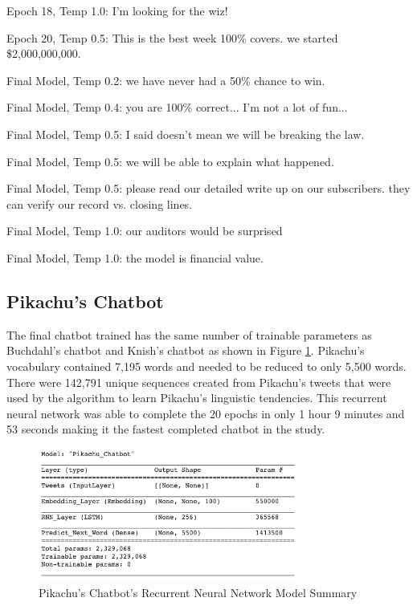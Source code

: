 \documentclass[5p,authoryear]{elsarticle}
\begin{document}
Epoch 18, Temp 1.0:
I’m looking for the wiz! 

Epoch 20, Temp 0.5:
This is the best week 100\% covers. we started \$2,000,000,000.

Final Model, Temp 0.2:
we have never had a 50\% chance to win. 

Final Model, Temp 0.4:
you are 100\% correct... I’m not a lot of fun... 

Final Model, Temp 0.5:
I said doesn’t mean we will be breaking the law.

Final Model, Temp 0.5:
we will be able to explain what happened. 

Final Model, Temp 0.5:
please read our detailed write up on our subscribers. they can verify our record vs. closing lines. 


Final Model, Temp 1.0:
our auditors would be surprised

Final Model, Temp 1.0:
the model is financial value. 



\subsection{Pikachu’s Chatbot}


The final chatbot trained has the same number of trainable parameters as Buchdahl’s chatbot and Knish’s chatbot as shown in Figure \ref{Pika Summary}. Pikachu’s vocabulary contained 7,195 words and needed to be reduced to only 5,500 words. There were 142,791 unique sequences created from Pikachu’s tweets that were used by the algorithm to learn Pikachu’s linguistic tendencies. This recurrent neural network was able to complete the 20 epochs in only 1 hour 9 minutes and 53 seconds making it the fastest completed chatbot in the study.


\begin{figure}[!htb] \centering
	\includegraphics[width=3.4in]{figures/Pika_Model.png}
	\caption[]{Pikachu’s Chatbot’s Recurrent Neural Network Model Summary} 
	\label{Pika Summary} 
\end{figure}
\end{document}
